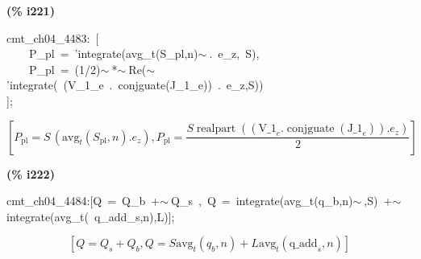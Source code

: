 \documentclass[fleqn]{article}
\begin{document}
\noindent
\begin{minipage}[t]{4.000000em}\color{red}\bfseries
(\% i221)	
\end{minipage}
\begin{minipage}[t]{\textwidth}\color{blue}
cmt\_ch04\_4483:\ [\\
\ \ \ \ P\_pl\ =\ 'integrate(avg\_t(S\_pl,n)\ensuremath{\sim\ }.\ e\_z,\ S),\\
\ \ \ \ P\_pl\ =\ (1/2)\ensuremath{\sim\ }*\ensuremath{\sim\ }Re(\ensuremath{\sim\ }'integrate(\ (V\_1\_e\ .\ conjguate(J\_1\_e))\ .\ e\_z,S))\\
];
\end{minipage}
\[\displaystyle \tag{\% o221} 
\left[ {P_{\ensuremath{\mathrm{pl}}}}=S\, \left( {{\ensuremath{\mathrm{avg}}}_t}\left( {S_{\ensuremath{\mathrm{pl}}}}\operatorname{,}n\right) \ensuremath{\mathrm{ . }}{e_z}\right) \operatorname{,}{P_{\ensuremath{\mathrm{pl}}}}=\frac{S \operatorname{realpart}\left( \left( {{\ensuremath{\mathrm{V\_ 1}}}_e}\ensuremath{\mathrm{ . }}\operatorname{conjguate}\left( {{\ensuremath{\mathrm{J\_ 1}}}_e}\right) \right) \ensuremath{\mathrm{ . }}{e_z}\right) }{2}\right] \mbox{}
\]


\noindent
\begin{minipage}[t]{4.000000em}\color{red}\bfseries
(\% i222)	
\end{minipage}
\begin{minipage}[t]{\textwidth}\color{blue}
cmt\_ch04\_4484:[Q\ =\ Q\_b\ +\ensuremath{\sim\ }Q\_s\ ,\ Q\ =\ integrate(avg\_t(q\_b,n)\ensuremath{\sim\ },S)\ +\ensuremath{\sim\ }integrate(avg\_t(\ q\_add\_s,n),L)];
\end{minipage}
\[\displaystyle \tag{\% o222} 
\left[ Q={Q_s}+{Q_b}\operatorname{,}Q=S {{\ensuremath{\mathrm{avg}}}_t}\left( {q_b}\operatorname{,}n\right) +L {{\ensuremath{\mathrm{avg}}}_t}\left( {{\ensuremath{\mathrm{q\_ add}}}_s}\operatorname{,}n\right) \right] \mbox{}
\]
\end{document}
